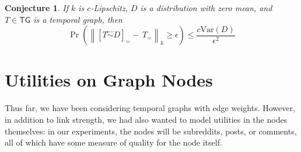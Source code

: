 \documentclass{article}
\newtheorem{conj}{Conjecture}
\theoremstyle{definition}
\newcommand{\noised}[2]{\left[#1 \stackrel{\gets}{\sim } #2\right]}
\begin{document}
	\begin{conj}
		If $k$ is $c$-Lipschitz, $D$ is a distribution with zero mean, and $T \in \mathsf{TG}$ is a temporal graph, then 
		\[ \Pr \left(\left\lVert \noised T {D} _= -~T_= \right\rVert_k \geq \epsilon \right)\leq \frac{c \mathrm{Var}(D)}{\epsilon^2} \]
	\end{conj}
	
%	
%	
	
	
	\section{Utilities on Graph Nodes} \label{sec:transformer}
	Thus far, we have been considering temporal graphs with edge weights. However, in addition to link strength, we had also wanted to model utilities in the nodes themselves: in our experiments, the nodes will be subreddits, posts, or comments, all of which have some measure of quality for the node itself.
	
	
\end{document}
